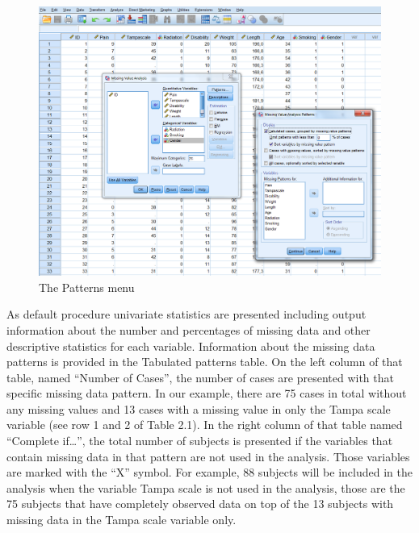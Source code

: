 \documentclass[]{book}
\begin{document}
\begin{figure}

{\centering \includegraphics[width=0.9\linewidth]{images/fig2.4} 

}

\caption{The Patterns menu}\label{fig:fig30}
\end{figure}

As default procedure univariate statistics are presented including
output information about the number and percentages of missing data and
other descriptive statistics for each variable. Information about the
missing data patterns is provided in the Tabulated patterns table. On
the left column of that table, named ``Number of Cases'', the number of
cases are presented with that specific missing data pattern. In our
example, there are 75 cases in total without any missing values and 13
cases with a missing value in only the Tampa scale variable (see row 1
and 2 of Table 2.1). In the right column of that table named ``Complete
if\ldots{}'', the total number of subjects is presented if the variables
that contain missing data in that pattern are not used in the analysis.
Those variables are marked with the ``X'' symbol. For example, 88
subjects will be included in the analysis when the variable Tampa scale
is not used in the analysis, those are the 75 subjects that have
completely observed data on top of the 13 subjects with missing data in
the Tampa scale variable only.
\end{document}
